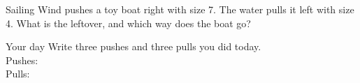 \begin{puzzle}{Sailing}
Wind pushes a toy boat right with size 7. The water pulls it left with size 4. What is the leftover, and which way does the boat go? \wline[4cm]
\end{puzzle}

\begin{puzzle}{Your day}
Write three pushes and three pulls you did today.\\
Pushes: \wline[10cm]\\[6pt]
Pulls: \wline[10cm]
\end{puzzle}
\clearpage
